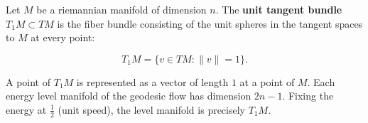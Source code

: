 Let $M$ be a riemannian manifold of dimension $n$. The \textbf{unit tangent bundle} $T_1M \subset TM$ is the fiber bundle consisting of the unit spheres in the tangent spaces to $M$ at every point:

$$T_1M = \{ v \in TM : \|v\| = 1 \}.$$

A point of $T_1M$ is represented as a vector of length $1$ at a point of $M$. Each energy level manifold of the geodesic flow has dimension $2n - 1$. Fixing the energy at $\frac{1}{2}$ (unit speed), the level manifold is precisely $T_1M$.
